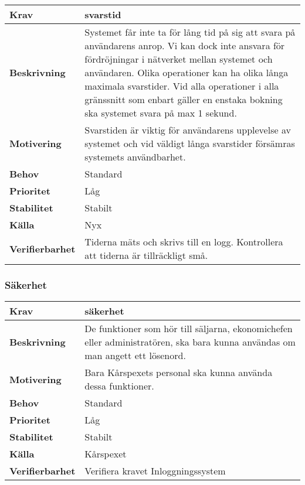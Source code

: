 \documentclass[a4paper, twoside, 11pt, titlepage]{article}
\begin{document}
		\begin{tabular} { | p{3cm} | p{12.2cm} | }
			\hline
			\textbf{Krav} & svarstid  \\
			\hline
			\textbf{Beskrivning} & Systemet får inte ta för lång tid på sig att svara på användarens anrop. Vi kan dock inte ansvara för fördröjningar i nätverket mellan systemet och användaren. Olika operationer kan ha olika långa maximala svarstider. Vid alla operationer i alla gränssnitt som enbart gäller en enstaka bokning ska systemet svara på max 1 sekund.  \\
			\hline
			\textbf{Motivering} & Svarstiden är viktig för användarens upplevelse av systemet och vid väldigt långa svarstider försämras systemets användbarhet.  \\
			\hline
			\textbf{Behov} & Standard  \\
			\hline
			\textbf{Prioritet} & Låg  \\
			\hline
			\textbf{Stabilitet} & Stabilt  \\
			\hline
			\textbf{Källa} & Nyx  \\
			\hline
			\textbf{Verifierbarhet} & Tiderna mäts och skrivs till en logg. Kontrollera att tiderna är tillräckligt små.  \\
			\hline
		\end{tabular}


	\subsubsection{Säkerhet}


		\begin{tabular} { | p{3cm} | p{12.2cm} | }
			\hline
			\textbf{Krav} & säkerhet  \\
			\hline
			\textbf{Beskrivning} & De funktioner som hör till säljarna, ekonomichefen eller administratören, ska bara kunna användas om man angett ett lösenord.  \\
			\hline
			\textbf{Motivering} & Bara Kårspexets personal ska kunna använda dessa funktioner.  \\
			\hline
			\textbf{Behov} & Standard  \\
			\hline
			\textbf{Prioritet} & Låg  \\
			\hline
			\textbf{Stabilitet} & Stabilt  \\
			\hline
			\textbf{Källa} & Kårspexet  \\
			\hline
			\textbf{Verifierbarhet} & Verifiera kravet Inloggningssystem  \\
			\hline
		\end{tabular}
\end{document}
